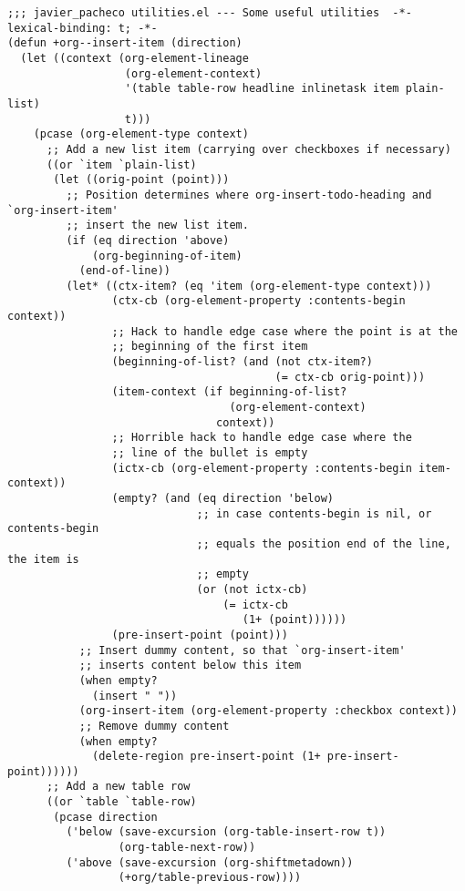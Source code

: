 \documentclass[11pt]{article}
\begin{document}
\begin{verbatim}
;;; javier_pacheco utilities.el --- Some useful utilities  -*- lexical-binding: t; -*-
(defun +org--insert-item (direction)
  (let ((context (org-element-lineage
                  (org-element-context)
                  '(table table-row headline inlinetask item plain-list)
                  t)))
    (pcase (org-element-type context)
      ;; Add a new list item (carrying over checkboxes if necessary)
      ((or `item `plain-list)
       (let ((orig-point (point)))
         ;; Position determines where org-insert-todo-heading and `org-insert-item'
         ;; insert the new list item.
         (if (eq direction 'above)
             (org-beginning-of-item)
           (end-of-line))
         (let* ((ctx-item? (eq 'item (org-element-type context)))
                (ctx-cb (org-element-property :contents-begin context))
                ;; Hack to handle edge case where the point is at the
                ;; beginning of the first item
                (beginning-of-list? (and (not ctx-item?)
                                         (= ctx-cb orig-point)))
                (item-context (if beginning-of-list?
                                  (org-element-context)
                                context))
                ;; Horrible hack to handle edge case where the
                ;; line of the bullet is empty
                (ictx-cb (org-element-property :contents-begin item-context))
                (empty? (and (eq direction 'below)
                             ;; in case contents-begin is nil, or contents-begin
                             ;; equals the position end of the line, the item is
                             ;; empty
                             (or (not ictx-cb)
                                 (= ictx-cb
                                    (1+ (point))))))
                (pre-insert-point (point)))
           ;; Insert dummy content, so that `org-insert-item'
           ;; inserts content below this item
           (when empty?
             (insert " "))
           (org-insert-item (org-element-property :checkbox context))
           ;; Remove dummy content
           (when empty?
             (delete-region pre-insert-point (1+ pre-insert-point))))))
      ;; Add a new table row
      ((or `table `table-row)
       (pcase direction
         ('below (save-excursion (org-table-insert-row t))
                 (org-table-next-row))
         ('above (save-excursion (org-shiftmetadown))
                 (+org/table-previous-row))))


\end{verbatim}
\end{document}
